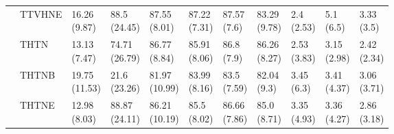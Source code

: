\begin{table}
\begin{tabular}{lllllllllll}
       & TTVHNE &   \makecell{16.26\\(9.87)} &   \makecell{88.5\\(24.45)} &   \makecell{87.55\\(8.01)} &  \makecell{87.22\\(7.31)} &   \makecell{87.57\\(7.6)} &   \makecell{83.29\\(9.78)} &       \makecell{2.4\\(2.53)} &    \makecell{5.1\\(6.5)} &   \makecell{3.33\\(3.5)} \\
       & THTN &   \makecell{13.13\\(7.47)} &  \makecell{74.71\\(26.79)} &   \makecell{86.77\\(8.84)} &  \makecell{85.91\\(8.06)} &    \makecell{86.8\\(7.9)} &   \makecell{86.26\\(8.27)} &      \makecell{2.53\\(3.83)} &  \makecell{3.15\\(2.98)} &  \makecell{2.42\\(2.34)} \\
       & THTNB &  \makecell{19.75\\(11.53)} &   \makecell{21.6\\(23.26)} &  \makecell{81.97\\(10.99)} &  \makecell{83.99\\(8.16)} &   \makecell{83.5\\(7.59)} &    \makecell{82.04\\(9.3)} &       \makecell{3.45\\(6.3)} &  \makecell{3.41\\(4.37)} &  \makecell{3.06\\(3.71)} \\
       & THTNE &   \makecell{12.98\\(8.03)} &  \makecell{88.87\\(24.11)} &  \makecell{86.21\\(10.19)} &   \makecell{85.5\\(8.02)} &  \makecell{86.66\\(7.86)} &    \makecell{85.0\\(8.71)} &      \makecell{3.35\\(4.93)} &  \makecell{3.36\\(4.27)} &  \makecell{2.86\\(3.18)} \\

\end{tabular}
\end{table}
